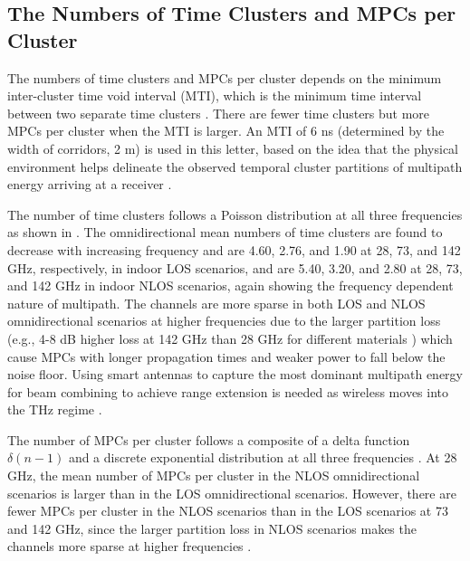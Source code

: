\documentclass[conference]{IEEEtran}
\begin{document}
\subsection{The Numbers of Time Clusters and MPCs per Cluster}
The numbers of time clusters and MPCs per cluster depends on the minimum inter-cluster time void interval (MTI), which is the minimum time interval between two separate time clusters \cite{Ju20a,samimi20163,rappaport2013millimeter}. There are fewer time clusters but more MPCs per cluster when the MTI is larger. An MTI of 6 ns \cite{Ju20a} (determined by the width of corridors, 2 m) is used in this letter, based on the idea that the physical environment helps delineate the observed temporal cluster partitions of multipath energy arriving at a receiver \cite{samimi20163,rappaport2013millimeter}. 

The number of time clusters follows a Poisson distribution at all three frequencies as shown in \cite{Ju20a}. The omnidirectional mean numbers of time clusters are found to decrease with increasing frequency and are 4.60, 2.76, and 1.90 at 28, 73, and 142 GHz, respectively, in indoor LOS scenarios, and are 5.40, 3.20, and 2.80 at 28, 73, and 142 GHz in indoor NLOS scenarios, again showing the frequency dependent nature of multipath. The channels are more sparse in both LOS and NLOS omnidirectional scenarios at higher frequencies due to the larger partition loss (e.g., 4-8 dB higher loss at 142 GHz than 28 GHz for different materials \cite{xing19GC}) which cause MPCs with longer propagation times and weaker power to fall below the noise floor. Using smart antennas to capture the most dominant multipath energy for beam combining to achieve range extension is needed as wireless moves into the THz regime \cite{rappaport19access,Sun14a,Samimi15b,Sun14b}. 

The number of MPCs per cluster follows a composite of a delta function $\delta (n-1)$ and a discrete exponential distribution at all three frequencies \cite{Ju20a}. At 28 GHz, the mean number of MPCs per cluster in the NLOS omnidirectional scenarios is larger than in the LOS omnidirectional scenarios. However, there are fewer MPCs per cluster in the NLOS scenarios than in the LOS scenarios at 73 and 142 GHz, since the larger partition loss in NLOS scenarios makes the channels more sparse at higher frequencies \cite{xing19GC,Ju20a}.
\end{document}
